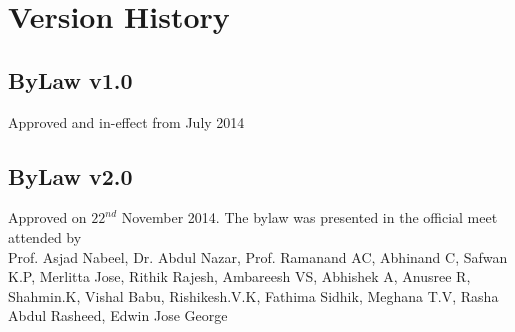 \section{Version History}
\subsection{ByLaw v1.0}
	Approved and in-effect from July 2014
\subsection{ByLaw v2.0}
	Approved on $22^{nd}$ November 2014. The bylaw was presented in the official meet attended by \\
	Prof. Asjad Nabeel, Dr. Abdul Nazar, Prof. Ramanand AC, Abhinand C, Safwan K.P, Merlitta Jose, Rithik Rajesh, Ambareesh VS, Abhishek A, Anusree R, Shahmin.K, Vishal Babu, Rishikesh.V.K, Fathima Sidhik, Meghana T.V, Rasha Abdul Rasheed, Edwin Jose George